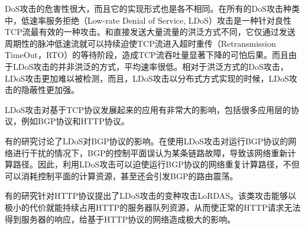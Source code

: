 DoS攻击的危害性很大，而且它的实现形式也是各不相同。在所有的DoS攻击种类中，低速率服务拒绝（Low-rate Denial of Service, LDoS）攻击\cite{LDoS}是一种针对良性TCP流最有效的一种攻击。和直接发送大量流量的洪泛方式不同，它仅通过发送周期性的脉冲低速流就可以持续迫使TCP流进入超时重传（Retransmission TimeOut，RTO）的等待阶段，造成TCP流吞吐量显著下降的可怕后果。而且由于LDoS攻击的并非洪泛的方式，平均速率很低。相对于洪泛方式的DoS攻击，LDoS攻击更加难以被检测，而且，LDoS攻击以分布式方式实现的时候，LDoS攻击的隐蔽性更加强。

LDoS攻击对基于TCP协议发展起来的应用有非常大的影响，包括很多应用层的协议，例如BGP协议和HTTP协议。

有的研究\cite{b2}讨论了LDoS对BGP协议的影响。在使用LDoS攻击对运行BGP协议的网络进行干扰的情况下，BGP的控制平面误认为某条链路故障，导致该网络重新计算路径。因此，利用LDoS攻击可以迫使运行BGP协议的网络重复计算路径，不但可以消耗控制平面的计算资源，甚至还会引发BGP的路由震荡。

有的研究\cite{Maci2007LoRDAS}针对HTTP协议提出了LDoS攻击的变种攻击LoRDAS。该类攻击能够以极小的代价就能持续占用HTTP的服务器队列资源，从而使正常的HTTP请求无法得到服务器的响应，给基于HTTP协议的网络造成极大的影响。


